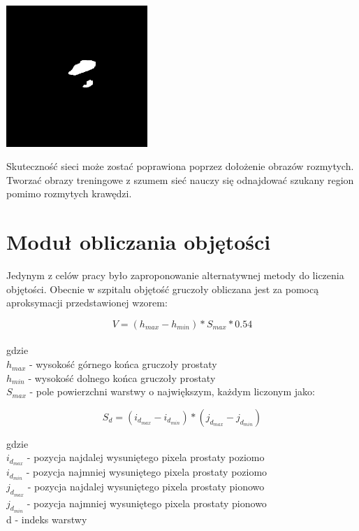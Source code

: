 \documentclass[a4paper,11pt,twoside]{report}
\theoremstyle{definition}
\begin{document}
\begin{minipage}{\linewidth}
	\centering
	\includegraphics[width=0.4\textwidth]{segmentation/segmentation_mask_2.png}
\end{minipage}


Skuteczność sieci może zostać poprawiona poprzez dołożenie obrazów rozmytych. Tworzać obrazy treningowe z szumem sieć nauczy się odnajdować szukany region pomimo rozmytych krawędzi.

\section{Moduł obliczania objętości}

Jedynym z celów pracy było zaproponowanie alternatywnej metody do liczenia objętości. Obecnie w szpitalu objętość gruczoły obliczana jest za pomocą aproksymacji przedstawionej wzorem:

\[V = (h_{max} - h_{min}) * S_{max} * 0.54\]
\\
gdzie 
\\
\(h_{max}\) - wysokość górnego końca gruczoły prostaty                     
\\
\(h_{min}\) - wysokość dolnego końca gruczoły prostaty                     
\\
\(S_{max}\) - pole powierzchni warstwy o największym, każdym liczonym jako:  

\[S_d = (i_{d_{max}} - i_{d_{min}}) * (j_{d_{max}} - j_{d_{min}})\] 

gdzie \\
\(i_{d_{max}}\) - pozycja najdalej wysuniętego pixela prostaty poziomo \\
\(i_{d_{min}}\) - pozycja najmniej wysuniętego pixela prostaty poziomo \\
\(j_{d_{max}}\) - pozycja najdalej wysuniętego pixela prostaty pionowo \\
\(j_{d_{min}}\) - pozycja najmniej wysuniętego pixela prostaty pionowo \\
d - indeks warstwy \\
\end{document}
